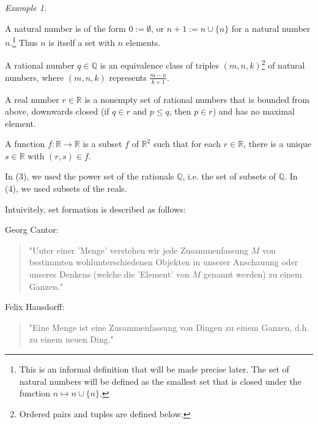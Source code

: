 \documentclass[a4paper, 11pt]{amsart}
\theoremstyle{remark}
\newtheorem{example}[example]{Example}
\newcommand{\QQ}{\mathbb{Q}}
\newcommand{\RR}{\mathbb{R}}
\newenvironment{enumerate-(1)}{\begin{enumerate}[label={\upshape (\arabic*)}, leftmargin=2pc]}{\end{enumerate}}
\begin{document}
\begin{example} \ 
\begin{enumerate-(1)} 
\item 
A natural number is of the form $0:=\emptyset$, or $n+1:=n\cup\{n\}$ for a natural number $n$.\footnote{This is an informal definition that will be made precise later. 
The set of natural numbers will be defined as the smallest set that is closed under the function $n \mapsto n \cup \{n\}$. 
} 
Thus $n$ is itself a set with $n$ elements. 
\item
A rational number $q\in \QQ$ is an equivalence class of triples $(m,n,k)$\footnote{Ordered pairs and tuples are defined below.} of natural numbers, where $(m,n,k)$ represents $\frac{m-n}{k+1}$. 
\item 
A real number $r\in \RR$ is a nonempty set of rational numbers that is bounded from above, downwards closed (if $q\in r$ and $p\leq q$, then $p\in r$) and has no maximal element. 
\item 
A function $f\colon \RR \rightarrow \RR$ is a subset $f$ of $\RR^2$ such that for each $r\in \RR$, there is a unique $s\in \RR$ with $(r,s)\in f$. 
\end{enumerate-(1)} 
\end{example} 

In (3), we used the power set of the rationals $\QQ$, i.e. the set of subsets of $\QQ$. 
In (4), we used subsets of the reals. 






Intuivitely, set formation is described as follows: 

Georg Cantor: 

\begin{quote} 
"Unter einer 'Menge' verstehen wir jede Zusammenfassung $M$ von bestimmten wohlunterschiedenen Objekten in unserer Anschauung oder unseres Denkens (welche die 'Element' von $M$ genannt werden) zu einem Ganzen."
\end{quote} 

Felix Hausdorff: 
\begin{quote} 
"Eine Menge ist eine Zusammenfassung von Dingen zu einem Ganzen, d.h. zu einem neuen Ding." 
\end{quote} 
\end{document}
